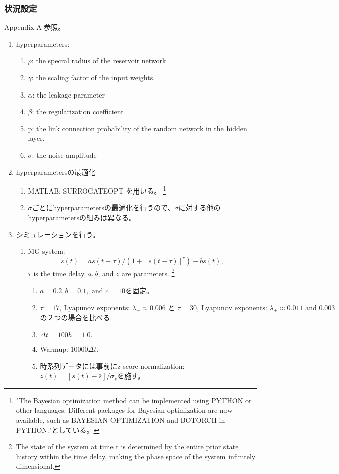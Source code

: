 \subsubsection{状況設定}
Appendix A 参照。
\begin{enumerate}
  \item hyperparameters:\begin{enumerate}
    \item $\rho$: the specral radius of the  reservoir network.
    \item $\gamma$: the scaling factor of the input weights.
    \item $\alpha$: the leakage parameter 
    \item $\beta$: the regularization coefficient 
    \item p: the link connection probability of the random network in the hidden layer.
    \item $\sigma$: the noise amplitude 
  \end{enumerate}
  \item hyperparametersの最適化\begin{enumerate}
    \item MATLAB: SURROGATEOPT を用いる。
      \footnote{"The Bayesian
      optimization method can be implemented using PYTHON or
      other languages. Different packages for Bayesian optimization are now available, such as BAYESIAN-OPTIMIZATION and
      BOTORCH in PYTHON."としている。}
    \item $\sigma$ごとにhyperparametersの最適化を行うので、$\sigma$に対する他のhyperparametersの組みは異なる。
  \end{enumerate}
  \item シミュレーションを行う。
  \begin{enumerate}
    \item MG system: 
    $$\dot{s}(t)=a s(t-\tau) /\left(1+[s(t-\tau)]^c\right)-b s(t),$$ $\tau$ is the time delay, $a, b$, and $c$ are parameters.
    \footnote{The state of the system at time t is determined by the entire prior state history
    within the time delay, making the phase space of the system
    infinitely dimensional.}  
    \begin{enumerate}
      \item $a=0.2, b=0.1, \text { and } c=10$を固定。
      \item $\tau=17,\ \text{Lyapunov exponents: } \lambda_{+} \approx 0.006 \text { と } \tau=30,\ \text{Lyapunov exponents: } \lambda_{+} \approx 0.011 \text{ and } 0.003$の２つの場合を比べる.
      \item $\Delta t=100 h=1.0.$
      \item Warmup: $10000 \Delta t.$
      \item 時系列データには事前にz-score normalization: $z(t)=[s(t)-\bar{s}] / \sigma_s$を施す。
    \end{enumerate}
  \end{enumerate}
\end{enumerate}
\clearpage

